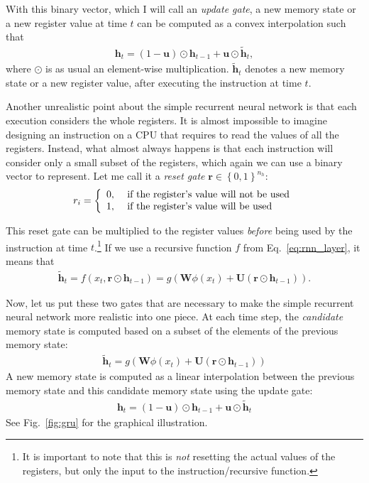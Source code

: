 \documentclass{report}
\newcommand{\vect}[1]{\mathbf{#1}}
\newcommand{\matr}[1]{\mathbf{#1}}
\newcommand{\vh}[0]{\vect{h}}
\newcommand{\vu}[0]{\vect{u}}
\newcommand{\vr}[0]{\vect{r}}
\newcommand{\mW}[0]{\matr{W}}
\newcommand{\mU}[0]{\matr{U}}
\begin{document}
With this binary vector, which I will call an {\em update gate}, a new memory
state or a new register value at time $t$ can be computed as a convex
interpolation such that
\begin{align}
    \label{eq:gru_leaky}
    \vh_{t} = (1 - \vu) \odot \vh_{t-1} + \vu \odot \tilde{\vh}_t,
\end{align}
where $\odot$ is as usual an element-wise multiplication. $\tilde{\vh}_t$
denotes a new memory state or a new register value, after executing the
instruction at time $t$.

Another unrealistic point about the simple recurrent neural network is that each
execution considers the whole registers. It is almost impossible to imagine
designing an instruction on a CPU that requires to read the values of all the
registers. Instead, what almost always happens is that each instruction will
consider only a small subset of the registers, which again we can use a binary
vector to represent. Let me call it a {\em reset gate} $\vr \in \left\{ 0,
1\right\}^{n_h}$:
\begin{align*}
    r_i = \left\{ 
        \begin{array}{l l}
            0, & \text{ if the register's value will not be used} \\
            1, & \text{ if the register's value will be used}
        \end{array}
        \right.
\end{align*}

This reset gate can be multiplied to the register values {\em before} being used
by the instruction at time $t$.\footnote{
    It is important to note that this is {\em not} resetting the actual values
    of the registers, but only the input to the instruction/recursive function.
} If we use a recursive function $f$ from Eq.~\eqref{eq:rnn_layer}, it means that
\begin{align} 
    \label{eq:gru_cand}
    \tilde{\vh}_t = f(x_t, \vr \odot \vh_{t-1}) = g(\mW \phi(x_t) + \mU (\vr
    \odot \vh_{t-1})).
\end{align}

Now, let us put these two gates that are necessary to make the simple recurrent
neural network more realistic into one piece. At each time step, the {\em
candidate} memory state is computed based on a subset of the elements of the
previous memory state:
\begin{align*}
    \tilde{\vh}_t = g(\mW \phi(x_t) + \mU (\vr \odot \vh_{t-1}))
\end{align*}
A new memory state is computed as a linear interpolation between the previous
memory state and this candidate memory state using the update gate:
\begin{align*}
    \vh_t = (1 - \vu) \odot \vh_{t-1} + \vu \odot \tilde{\vh}_t
\end{align*}
See Fig.~\ref{fig:gru} for the graphical illustration.
\end{document}
